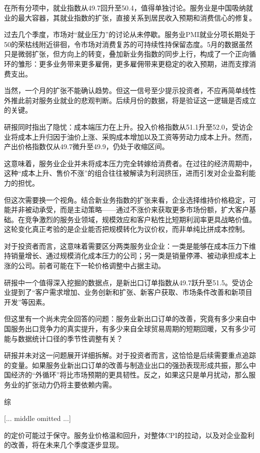 \documentclass[11pt]{ctexart}
\begin{document}
在所有分项中，就业指数从49.7回升至50.4，值得单独讨论。服务业是中国吸纳就业的最大容器，其就业指数的扩张，直接关系到居民收入预期和消费信心的修复。

过去几个季度，市场对“就业压力”的讨论从未停歇。服务业PMI就业分项长期处于50的荣枯线附近徘徊，令市场对消费复苏的可持续性持保留态度。5月的数据虽然只是微弱扩张，但方向上的转变，叠加新业务指数的同步上行，构成了一个正向循环的雏形：更多业务带来更多雇佣，更多雇佣带来更稳定的收入预期，进而支撑消费支出。

当然，一个月的扩张不能确认趋势。但这一信号至少提示投资者，不应再简单线性外推此前对服务业就业的悲观判断。后续月份的数据，将是验证这一逻辑是否成立的关键。

研报同时指出了隐忧：成本端压力在上升。投入价格指数从51.1升至52.0，受访企业将成本上升归因于油价上涨、采购成本增加以及工资等劳动力成本上升。然而，产出价格指数仅从49.7微升至49.9，仍处于收缩区间。

这意味着，服务业企业并未将成本压力完全转嫁给消费者。在过往的经济周期中，这种“成本上升、售价不涨”的组合往往被解读为利润挤压，进而引发对企业盈利能力的担忧。

但这次需要换一个视角。结合新业务指数的扩张来看，企业选择维持价格稳定，可能并非被动承受，而是主动策略——通过不涨价来获取更多市场份额，扩大客户基础。在竞争激烈的服务业领域，规模效应和客户粘性比短期利润率更具战略价值。这轮变化真正考验的是企业能否把规模转化为议价权，而非单纯比拼成本控制。

对于投资者而言，这意味着需要区分两类服务业企业：一类是能够在成本压力下维持销量增长、通过规模消化成本压力的公司；另一类是销量停滞、被动承担成本上涨的公司。前者可能在下一轮价格调整中占据主动。

研报中一个值得深入挖掘的数据点，是新出口订单指数从49.7跃升至51.5。受访企业提到了“客户需求增加、业务创新和扩张、新客户获取、市场条件改善和新项目开发”等因素。

但这里有一个尚未完全回答的问题：服务业新出口订单的改善，究竟有多少来自中国服务出口竞争力的真实提升，有多少来自全球贸易周期的短期回暖，又有多少可能与数据统计口径的季节性调整有关？

研报并未对这一问题展开详细拆解。对于投资者而言，这恰恰是后续需要重点追踪的变量。如果服务业新出口订单的改善与制造业出口的强劲表现形成共振，那么中国经济的“外循环”将比市场预期的更具韧性。反之，如果这只是单月扰动，那么服务业的扩张动力仍将主要依赖内需。

综

[... middle omitted ...]

的定价可能过于保守。服务业价格温和回升，对整体CPI的拉动，以及对企业盈利的改善，将在未来几个季度逐步显现。
\end{document}
